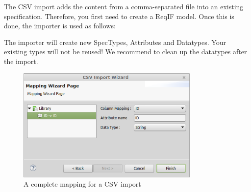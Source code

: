 The CSV import adds the content from a comma-separated file into an existing specification.  Therefore, you first need to create a ReqIF model.  Once this is done, the importer is used as follows:

\begin{warning}
The importer will create new SpecTypes, Attributes and Datatypes.  Your existing types will not be reused!  We recommend to clean up the datatypes after the import.
\end{warning}

\begin{figure}
  \centering
  \includegraphics[width=0.8\textwidth]{../rmf-images/CSV_import.png}
  \caption{A complete mapping for a CSV import}
  \label{fig:csv}
\end{figure}

